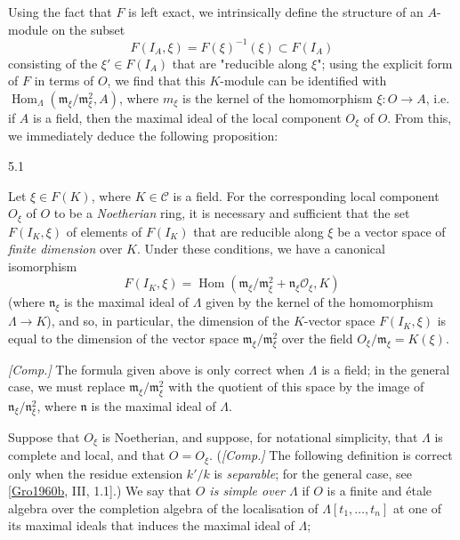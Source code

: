   Using the fact that \(F\) is left exact, we intrinsically define the structure of an \(A\)-module on the subset
  \[     F(I_A,\xi )     = F(\xi )^{-1}(\xi ) \subset  F(I_A)   \]
  consisting of the \(\xi '\in  F(I_A)\) that are "reducible along \(\xi \)";
  using the explicit form of \(F\) in terms of \(O\), we find that this \(K\)-module can be identified with \(\operatorname {Hom}_\Lambda (\mathfrak {m}_{\xi }/\mathfrak {m}_\xi ^2,A)\), where \(m_\xi \) is the kernel of the homomorphism \(\xi \colon  O\to  A\), i.e. if \(A\) is a field, then the maximal ideal of the local component \(O_\xi \) of \(O\).
  From this, we immediately deduce the following proposition:\begin{proposition}{5.1}\label{fga3.ii-a.5-proposition-5.1}\skipsinglepar\par{}Let \(\xi \in  F(K)\), where \(K\in \mathcal {C}\) is a field.
    For the corresponding local component \(O_\xi \) of \(O\) to be a \emph{Noetherian} ring, it is necessary and sufficient that the set \(F(I_K,\xi )\) of elements of \(F(I_K)\) that are reducible along \(\xi \) be a vector space of \emph{finite dimension} over \(K\).
    Under these conditions, we have a canonical isomorphism
    \[       F(I_K,\xi )       = \operatorname {Hom}(\mathfrak {m}_{\xi }/\mathfrak {m}_\xi ^2+\mathfrak {n}_\xi \mathscr {O}_\xi , K)     \]
    (where \(\mathfrak {n}_\xi \) is the maximal ideal of \(\Lambda \) given by the kernel of the homomorphism \(\Lambda \to  K\)), and so, in particular, the dimension of the \(K\)-vector space \(F(I_K,\xi )\) is equal to the dimension of the vector space \(\mathfrak {m}_{\xi }/\mathfrak {m}_\xi ^2\) over the field \(O_{\xi }/\mathfrak {m}_\xi =K(\xi )\).\par{}\emph{[Comp.]}
    The formula given above is only correct when \(\Lambda \) is a field; in the general case, we must replace \(\mathfrak {m}_{\xi }/\mathfrak {m}_\xi ^2\) with the quotient of this space by the image of \(\mathfrak {n}_{\xi }/\mathfrak {n}_\xi ^2\), where \(\mathfrak {n}\) is the maximal ideal of \(\Lambda \).\end{proposition}\par{}Suppose that \(O_\xi \) is Noetherian, and suppose, for notational simplicity, that \(\Lambda \) is complete and local, and that \(O=O_\xi \).
  (\emph{[Comp.]} The following definition is correct only when the residue extension \(k'/k\) is \emph{separable}; for the general case, see [\hyperref[Gro1960b]{Gro1960b}, III, 1.1].)
  We say that \emph{\(O\) is simple over \(\Lambda \)} if \(O\) is a finite and étale algebra over the completion algebra of the localisation of \(\Lambda [t_1,\ldots ,t_n]\) at one of its maximal ideals that induces the maximal ideal of \(\Lambda \);
